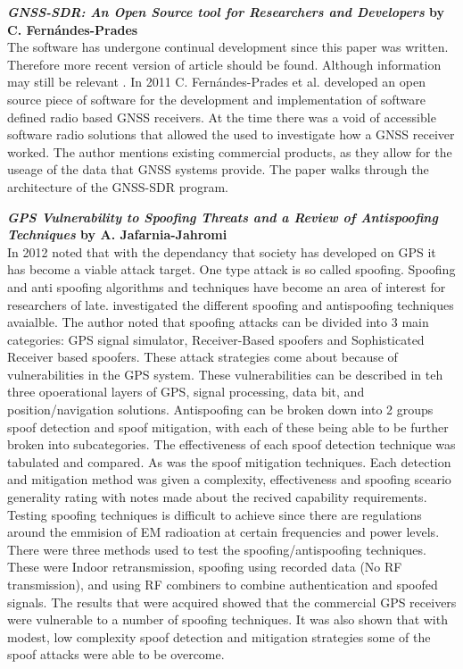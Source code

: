 \medskip

\textbf{\emph{GNSS-SDR: An Open Source tool for Researchers and Developers} by C. Fern\'andes-Prades} \\
The software has undergone continual development since this paper was written. Therefore more recent version of article should be found.
Although information may still be relevant \cite{RN16}.
In 2011 C. Fern\'andes-Prades et al. developed an open source piece of software for the development and implementation of software defined radio based
GNSS receivers. At the time there was a void of accessible software radio solutions that allowed the used to investigate how a GNSS receiver worked.
The author mentions existing commercial products, as they allow for the useage of the data that GNSS systems provide.
The paper walks through the architecture of the GNSS-SDR program.

\medskip

\textbf{\emph{GPS Vulnerability to Spoofing Threats and a Review of Antispoofing Techniques} by A. Jafarnia-Jahromi} \\
In 2012 \textcite{RN6} noted that with the dependancy that society has developed on GPS it has become a viable attack target. One type attack is
so called spoofing. Spoofing and anti spoofing algorithms and techniques have become an area of interest for researchers of late. \citeauthor{RN6}
investigated the different spoofing and antispoofing techniques avaialble. The author noted that spoofing attacks can be divided into 3 main categories:
GPS signal simulator, Receiver-Based spoofers and Sophisticated Receiver based spoofers. These attack strategies come about because of vulnerabilities in the GPS system.
These vulnerabilities can be described in teh three opoerational layers of GPS, signal processing, data bit, and position/navigation solutions.
Antispoofing can be broken down into 2 groups spoof detection and spoof mitigation, with each of these being able to be further broken into subcategories.
The effectiveness of each spoof detection technique was tabulated and compared. As was the spoof mitigation techniques. Each detection and mitigation
method was given a complexity, effectiveness and spoofing sceario generality rating with notes made about the recived capability requirements.
Testing spoofing techniques is difficult to achieve since there are regulations around the emmision of EM radioation at certain frequencies and power levels.
There were three methods used to test the spoofing/antispoofing techniques. These were Indoor retransmission, spoofing using recorded data (No RF transmission), and
using RF combiners to combine authentication and spoofed signals.
The results that were acquired showed that the commercial GPS receivers were vulnerable to a number of spoofing techniques. It was also
shown that with modest, low complexity spoof detection and mitigation strategies some of the spoof attacks were able to be overcome.

